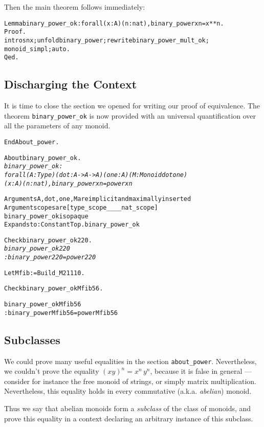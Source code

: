 \documentclass[a4]{report}
\begin{document}
Then the main theorem follows immediately:

\begin{alltt}
  Lemma binary_power_ok : forall (x:A)(n:nat), binary_power x n = x ** n.
  Proof.
    intros n x;unfold binary_power;rewrite binary_power_mult_ok;
    monoid_simpl;auto.
  Qed.  
\end{alltt}



\subsection{Discharging the Context}

It is time to close the section we opened for writing our proof of equivalence.
The theorem \texttt{binary\_power\_ok} is now provided with an universal
quantification over all the parameters of any monoid.

\begin{alltt}
End About_power.

About binary_power_ok.\it\color{red}
binary_power_ok :
forall (A : Type) (dot : A -> A -> A) (one : A) (M : Monoid dot one) 
  (x : A) (n : nat), binary_power x n = power x n

Arguments A, dot, one, M are implicit and maximally inserted
Argument scopes are [type_scope _ _ _ _ nat_scope]
binary_power_ok is opaque
Expands to: Constant Top.binary_power_ok\tt\color{black}

Check binary_power_ok 2 20.\it\color{red}
binary_power_ok 2 20
     : binary_power 2 20 = power 2 20\tt\color{black}

Let Mfib := Build_M2 1 1 1 0.

Check binary_power_ok Mfib 56.\it\color{red}

 binary_power_ok Mfib 56
     : binary_power Mfib 56 = power Mfib 56

\end{alltt}


\subsection{Subclasses}
We could prove many useful equalities in the section \texttt{about\_power}.
Nevertheless, we couldn't prove the equality $(xy)^n = x^n\,y^n$, because it is false
in general --- consider for instance the free monoid of strings, or simply
matrix multiplication. Nevertheless, this equality holds in every commutative
(a.k.a. \emph{abelian}) monoid.

Thus we say that abelian monoids form a \emph{subclass} of the class 
of monoids, and prove this equality in a context declaring an arbitrary
instance of this subclass.
\end{document}
